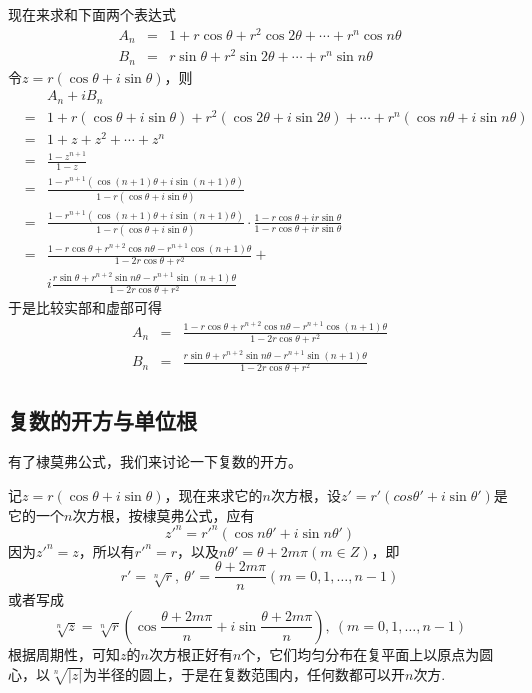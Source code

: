\begin{example}
  现在来求和下面两个表达式
  \begin{eqnarray*}
    A_n & = & 1 + r\cos{\theta} + r^2\cos{2\theta}+\cdots+r^n\cos{n\theta} \\
    B_n & = & r\sin{\theta} + r^2\sin{2\theta} + \cdots + r^n\sin{n\theta}
  \end{eqnarray*}
  令$z=r(\cos{\theta}+i\sin{\theta})$，则
  \begin{eqnarray*}
   && A_n+iB_n \\ 
   & = & 1 + r(\cos{\theta}+i\sin{\theta})+r^2(\cos{2\theta}+i\sin{2\theta})+\cdots+r^n(\cos{n\theta}+i\sin{n\theta}) \\
   & = & 1+ z + z^2 + \cdots + z^n \\
   & = & \frac{1-z^{n+1}}{1-z} \\
    & = & \frac{1-r^{n+1}(\cos{(n+1)\theta}+i\sin{(n+1)\theta})}{1-r(\cos{\theta}+i\sin{\theta})} \\
       & = & \frac{1-r^{n+1}(\cos{(n+1)\theta}+i\sin{(n+1)\theta})}{1-r(\cos{\theta}+i\sin{\theta})} \cdot \frac{1-r\cos{\theta}+ir\sin{\theta}}{1-r\cos{\theta}+ir\sin{\theta}} \\
   & = & \frac{1-r\cos{\theta}+r^{n+2}\cos{n\theta}-r^{n+1}\cos{(n+1)\theta}}{1-2r\cos{\theta}+r^2} + \\
    && i \frac{r\sin{\theta}+r^{n+2}\sin{n\theta}-r^{n+1}\sin{(n+1)\theta}}{1-2r\cos{\theta}+r^2}
  \end{eqnarray*}
  于是比较实部和虚部可得
  \begin{eqnarray*}
    A_n & = & \frac{1-r\cos{\theta}+r^{n+2}\cos{n\theta}-r^{n+1}\cos{(n+1)\theta}}{1-2r\cos{\theta}+r^2} \\
    B_n & = & \frac{r\sin{\theta}+r^{n+2}\sin{n\theta}-r^{n+1}\sin{(n+1)\theta}}{1-2r\cos{\theta}+r^2}
  \end{eqnarray*}
\end{example}

\subsection{复数的开方与单位根}
\label{sec:n-th-root-of-one}



有了棣莫弗公式，我们来讨论一下复数的开方。

记$z=r(\cos{\theta}+i\sin{\theta})$，现在来求它的$n$次方根，设$z'=r'(cos{\theta'+i\sin{\theta'}})$是它的一个$n$次方根，按棣莫弗公式，应有
\[ z'^n=r'^n(\cos{n\theta'}+i\sin{n\theta'}) \]
因为$z'^n=z$，所以有$r'^n=r$，以及$n\theta'=\theta+2m\pi(m \in Z)$，即
\[ r'=\sqrt[n]{r}, \  \theta'=\frac{\theta+2m\pi}{n}(m=0,1,\ldots,n-1) \]
或者写成
\[ \sqrt[n]{z}=\sqrt[n]{r} \left( \cos{\frac{\theta+2m\pi}{n}}+i\sin{\frac{\theta+2m\pi}{n}} \right), \  (m=0,1,\ldots,n-1) \]
根据周期性，可知$z$的$n$次方根正好有$n$个，它们均匀分布在复平面上以原点为圆心，以$\sqrt[n]{|z|}$为半径的圆上，于是在复数范围内，任何数都可以开$n$次方.


